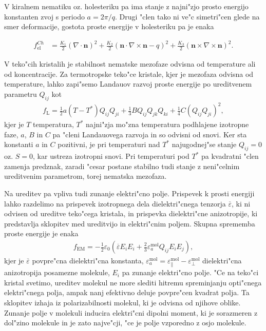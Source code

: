 \documentclass[a4paper,10pt]{article}
\renewcommand{\vec}{\mathbf}
\begin{document}
V kiralnem nematiku oz. holesteriku pa ima stanje z najni"zjo prosto energijo konstanten zvoj s periodo $a = 2\pi / q$.
Drugi "clen tako ni ve"c simetri"cen glede na smer deformacije, gostota proste energije v holesteriku pa je enaka

\begin{align}
 f_{\mathrm{el}}^{Ch} &= \frac{K_1}{2} (\nabla \cdot \vec n)^2 + \frac{K_2}{2} (\vec n \cdot \nabla \times \vec n - q)^2 + \frac{K_3}{2} (\vec n \times \nabla \times \vec n)^2. 
\end{align}

V teko"cih kristalih je stabilnost nematske mezofaze odvisna od temperature ali od koncentracije. 
Za termotropske teko"ce kristale, kjer je mezofaza odvisna od temperature, lahko zapi"semo Landauov razvoj proste energije po ureditvenem parametru $Q_{ij}$ kot
\begin{align}
  f_{\mathrm{L}} = \frac{1}{2}a(T-T^*)Q_{ij}Q_{ji} + \frac{1}{3}BQ_{ij}Q_{jk}Q_{ki} + \frac{1}{4}C(Q_{ij}Q_{ji})^2,
\end{align}
kjer je $T$ temperatura, $T^*$ najni"zja mo"zna temperatura podhlajene izotropne faze, $a$, $B$ in $C$ pa "cleni Landauovega razvoja in so odvisni od snovi. 
Ker sta konstanti $a$ in $C$ pozitivni, je pri temperaturi nad $T^*$ najugodnej"se stanje $Q_{ij}=0$ oz. $S=0$, kar ustreza izotropni snovi. 
Pri temperaturi pod $T^*$ pa kvadratni "clen zamenja predznak, zaradi "cesar postane stabilno tudi stanje z neni"celnim ureditvenim parametrom, torej nematska mezofaza. 

Na ureditev pa vpliva tudi zunanje elektri"cno polje. 
Prispevek k prosti energiji lahko razdelimo na prispevek izotropnega dela dielektri"cnega tenzorja $\overline\varepsilon$, ki ni odvisen od ureditve teko"cega kristala, in prispevka dielektri"cne anizotropije, ki predstavlja sklopitev med ureditvijo in elektri"cnim poljem. 
Skupna sprememba proste energije je enaka
\begin{align}
\label{eq:dielektricna-sklopitev}
  f_{\mathrm{EM}} = -\frac{1}{2}\varepsilon_0 \left(\overline\varepsilon E_i E_i + \frac{2}{3}\varepsilon_a^{\mathrm{mol}} Q_{ij}E_iE_j \right),
\end{align}
kjer je $\overline{\varepsilon}$ povpre"cna dielektri"cna konstanta, $\varepsilon_a^{\mathrm{mol}} = \varepsilon_{\parallel}^{\mathrm{mol}} - \varepsilon_{\perp}^{\mathrm{mol}}$ dielektri"cna anizotropija posamezne molekule, $E_i$ pa zunanje elektri"cno polje. 
"Ce na teko"ci kristal svetimo, ureditev molekul ne more slediti hitremu spreminjanju opti"cnega elektri"cnega polja, ampak nanj efektivno deluje povpre"cen kvadrat polja. 
Ta sklopitev izhaja iz polarizabilnosti molekul, ki je odvisna od njihove oblike. 
Zunanje polje v molekuli inducira elektri"cni dipolni moment, ki je sorazmeren z dol"zino molekule in je zato najve"cji, "ce je polje vzporedno z osjo molekule. 
\end{document}

